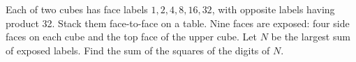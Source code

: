 Each of two cubes has face labels $1,2,4,8,16,32$, with opposite labels having product 32. Stack them face-to-face on a table. Nine faces are exposed: four side faces on each cube and the top face of the upper cube. Let $N$ be the largest sum of exposed labels. Find the sum of the squares of the digits of $N$.
